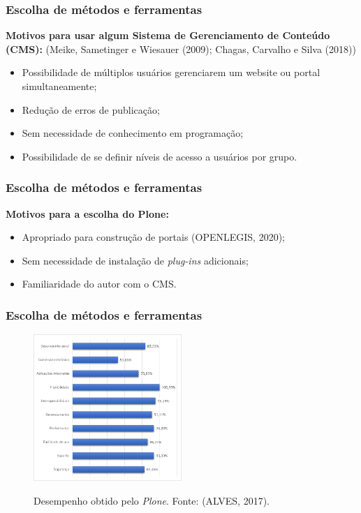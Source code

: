 \documentclass{beamer}
\begin{document}
\begin{frame}
    \frametitle{Escolha de métodos e ferramentas}
    \textbf{Motivos para usar algum Sistema de Gerenciamento de Conteúdo (CMS):} (Meike, Sametinger e Wiesauer (2009); Chagas, Carvalho e Silva (2018))
    \begin{itemize}
        \item Possibilidade de múltiplos usuários gerenciarem um website ou portal simultaneamente;
        \item Redução de erros de publicação; %
        \item Sem necessidade de conhecimento em programação; %
        \item Possibilidade de se definir níveis de acesso a usuários por grupo. %
    \end{itemize}
\end{frame}

\begin{frame}
    \frametitle{Escolha de métodos e ferramentas}
    \textbf{Motivos para a escolha do Plone:}
    \begin{itemize}
        \item Apropriado para construção de portais (OPENLEGIS, 2020); %
        \item Sem necessidade de instalação de \textit{plug-ins} adicionais; %
        \item Familiaridade do autor com o CMS.
    \end{itemize}
\end{frame}


\begin{frame}
    \frametitle{Escolha de métodos e ferramentas}
    
    \begin{figure}[htb]
        \centering
        \caption{Desempenho obtido pelo \textit{Plone}. Fonte: (ALVES, 2017).}
        \includegraphics[width=0.5\textwidth]{../figuras/desempenho-plone}
        \label{plone}
    
    \end{figure}
    
\end{frame}
\end{document}
